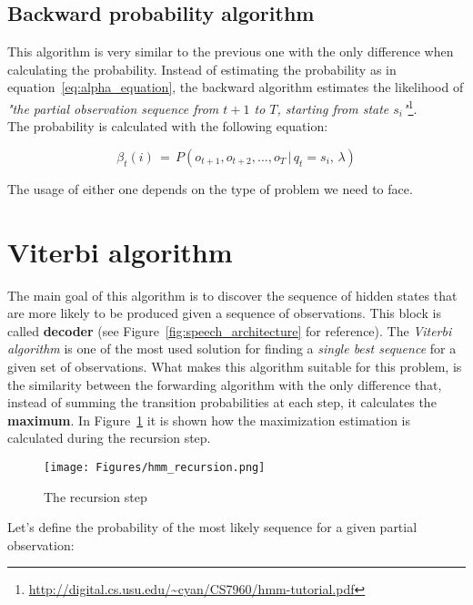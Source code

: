 \subsection{Backward probability algorithm}
This algorithm is very similar to the previous one with the only difference when calculating the probability. Instead of estimating the probability as in equation~\ref{eq:alpha_equation}, the backward algorithm estimates the likelihood of \textit{"the partial observation sequence from $t+1$ to $T$, starting from state $s_{i}$"}\footnote{\url{http://digital.cs.usu.edu/~cyan/CS7960/hmm-tutorial.pdf}}. \\

\noindent The probability is calculated with the following equation:

\begin{equation}
\label{eq:backward_algorithm}
	\beta_{t}(i) \, = \, P(o_{t+1}, o_{t+2}, ... , o_{T} \, | \, q_{t} = s_{i}, \, \lambda)
\end{equation}

\noindent The usage of either one depends on the type of problem we need to face.


\section{Viterbi algorithm}
\label{sec:viterbi}
The main goal of this algorithm is to discover the sequence of hidden states that are more likely to be produced given a sequence of observations. This block is called \textbf{decoder} (see Figure~\ref{fig:speech_architecture} for reference). The \textit{Viterbi algorithm} is one of the most used solution for finding a \textit{single best sequence} for a given set of observations. What makes this algorithm suitable for this problem, is the similarity between the forwarding algorithm with the only difference that, instead of summing the transition probabilities at each step, it calculates the \textbf{maximum}. In Figure~\ref{fig:hmm_recursion} it is shown how the maximization estimation is calculated during the recursion step.

\begin{figure}[!ht]
	\centering
	\texttt{[image: Figures/hmm\_recursion.png]}
	\caption{The recursion step}
	\label{fig:hmm_recursion}
\end{figure}

\noindent Let's define the probability of the most likely sequence for a given partial observation:

